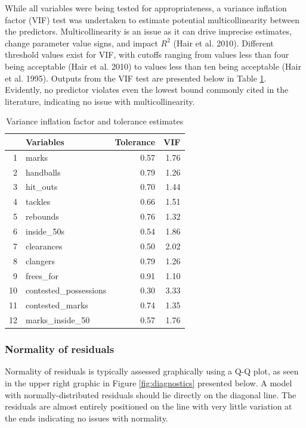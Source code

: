 \documentclass{article}
\begin{document}
While all variables were being tested for appropriateness, a variance inflation factor (VIF) test was undertaken to estimate potential multicollinearity between the predictors. Multicollinearity is an issue as it can drive imprecise estimates, change parameter value signs, and impact \(R^2\) (Hair et al. 2010). Different threshold values exist for VIF, with cutoffs ranging from values less than four being acceptable (Hair et al. 2010) to values less than ten being acceptable (Hair et al. 1995). Outputs from the VIF test are presented below in Table \ref{tab:vif}. Evidently, no predictor violates even the lowest bound commonly cited in the literature, indicating no issue with multicollinearity.

\begin{table}[ht]
\centering
\begin{tabular}{rlrr}
  \hline
 & Variables & Tolerance & VIF \\ 
  \hline
1 & marks & 0.57 & 1.76 \\ 
  2 & handballs & 0.79 & 1.26 \\ 
  3 & hit\_outs & 0.70 & 1.44 \\ 
  4 & tackles & 0.66 & 1.51 \\ 
  5 & rebounds & 0.76 & 1.32 \\ 
  6 & inside\_50s & 0.54 & 1.86 \\ 
  7 & clearances & 0.50 & 2.02 \\ 
  8 & clangers & 0.79 & 1.26 \\ 
  9 & frees\_for & 0.91 & 1.10 \\ 
  10 & contested\_possessions & 0.30 & 3.33 \\ 
  11 & contested\_marks & 0.74 & 1.35 \\ 
  12 & marks\_inside\_50 & 0.57 & 1.76 \\ 
   \hline
\end{tabular}
\caption{Variance inflation factor and tolerance estimates} 
\label{tab:vif}
\end{table}

\hypertarget{normality-of-residuals}{%
\subsubsection{Normality of residuals}\label{normality-of-residuals}}

Normality of residuals is typically assessed graphically using a Q-Q plot, as seen in the upper right graphic in Figure \ref{fig:diagnostics} presented below. A model with normally-distributed residuals should lie directly on the diagonal line. The residuals are almost entirely positioned on the line with very little variation at the ends indicating no issues with normality.
\end{document}
